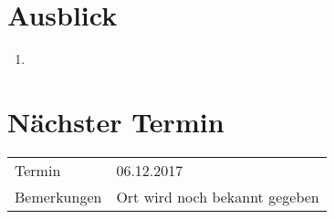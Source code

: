 \documentclass[11pt, a4paper,oneside]{scrartcl}
\begin{document}
	\section{Ausblick}
	\begin{enumerate}
		\item 
	\end{enumerate}
	
	\section{Nächster Termin}
	\begin{tabu} to \linewidth {l X }
		\toprule
		Termin & 06.12.2017  \\
		Bemerkungen & Ort wird noch bekannt gegeben  \\
		\bottomrule
	\end{tabu}
	
\end{document}
